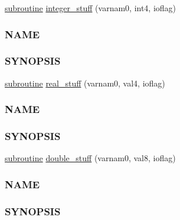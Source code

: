 \begin{DoxyCompactItemize}
\item 
\hyperlink{M__stopwatch_83_8txt_acfbcff50169d691ff02d4a123ed70482}{subroutine} \hyperlink{interfacem__calculator_1_1stuff_a5fe04fa7587b89cb2980bb8391d071ce}{integer\+\_\+stuff} (varnam0, int4, ioflag)
\begin{DoxyCompactList}\small\item\em \subsubsection*{N\+A\+ME}

\subsubsection*{S\+Y\+N\+O\+P\+S\+IS}\end{DoxyCompactList}\item 
\hyperlink{M__stopwatch_83_8txt_acfbcff50169d691ff02d4a123ed70482}{subroutine} \hyperlink{interfacem__calculator_1_1stuff_a7d6dbcffdf1001e3104f2947699aca22}{real\+\_\+stuff} (varnam0, val4, ioflag)
\begin{DoxyCompactList}\small\item\em \subsubsection*{N\+A\+ME}

\subsubsection*{S\+Y\+N\+O\+P\+S\+IS}\end{DoxyCompactList}\item 
\hyperlink{M__stopwatch_83_8txt_acfbcff50169d691ff02d4a123ed70482}{subroutine} \hyperlink{interfacem__calculator_1_1stuff_a493c946ddd5ffdf8d0d7f006b93f7d83}{double\+\_\+stuff} (varnam0, val8, ioflag)
\begin{DoxyCompactList}\small\item\em \subsubsection*{N\+A\+ME}

\subsubsection*{S\+Y\+N\+O\+P\+S\+IS}\end{DoxyCompactList}\end{DoxyCompactItemize}


